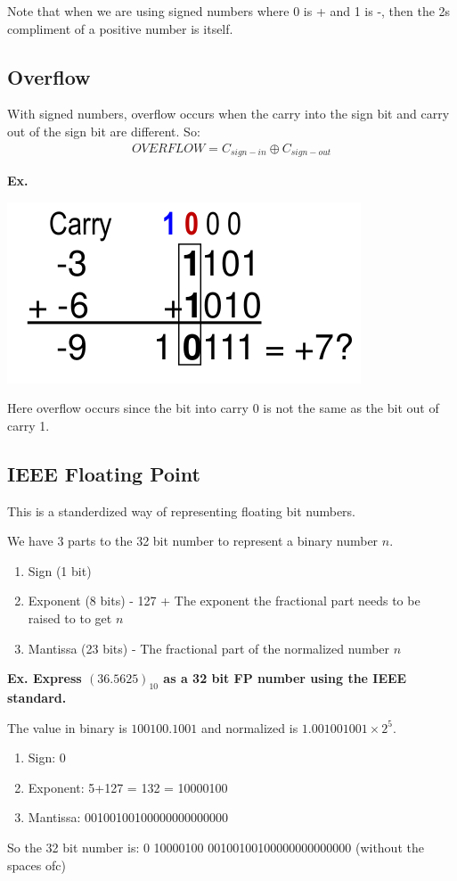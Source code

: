 \documentclass[12pt,letterpaper]{article} \usepackage{amsmath} \usepackage{graphicx} \usepackage[margin=1in]{geometry} \usepackage{longtable}  \usepackage{amssymb}
\begin{document}
		Note that when we are using signed numbers where 0 is + and 1 is -, then the 2s compliment of a positive number is itself.  
		
		\subsection{Overflow}
		With signed numbers, overflow occurs when the carry into the sign bit and carry out of the sign bit are different. So:
		\begin{align*}
			OVERFLOW = C_{sign-in} \oplus C_{sign-out}
		\end{align*}
		
		\begin{mdframed}[]
			\textbf{Ex. }
			\begin{center}
			\includegraphics[width=0.3\linewidth]{ex3}
			\end{center}
			Here overflow occurs since the bit into carry 0 is not the same as the bit out of carry 1. 
		
		\end{mdframed}
		
		\subsection{IEEE Floating Point}
		This is a standerdized way of representing floating bit numbers. 
		
		We have 3 parts to the 32 bit number to represent a binary number $n$. 
		\begin{enumerate}[]
			\item Sign (1 bit)
			\item Exponent (8 bits) - 127 + The exponent the fractional part needs to be raised to to get $n$ 
			\item Mantissa (23 bits) - The fractional part of the normalized number $n$
		\end{enumerate}
	
		\begin{mdframed}[]
		\textbf{Ex. Express $(36.5625)_{10}$ as a 32 bit FP number using the IEEE standard.}
		
		The value in binary is $100100.1001$ and normalized is $1.001001001 \times 2^5$.
		
		\begin{enumerate}[noitemsep]
			\item Sign: 0
			\item Exponent: 5+127 = 132 = 10000100 
			\item Mantissa: 00100100100000000000000
		\end{enumerate}
		
		So the 32 bit number is: 0 10000100 00100100100000000000000 (without the spaces ofc)
		\end{mdframed}
		
\end{document}
